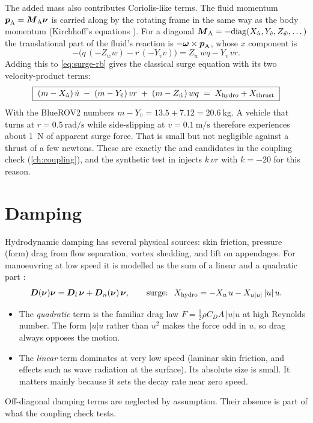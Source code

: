 The added mass also contributes Coriolis-like terms. The fluid momentum
$\boldsymbol{p}_\mathrm{A} = \boldsymbol{M}_\mathrm{A}\boldsymbol{\nu}$ is carried along by the rotating frame
in the same way as the body momentum (Kirchhoff's equations \cite{newman1977}). For a diagonal
$\boldsymbol{M}_\mathrm{A} = -\mathrm{diag}(X_{\dot u}, Y_{\dot v}, Z_{\dot w}, \dots)$ the translational
part of the fluid's reaction is $-\boldsymbol{\omega}\times\boldsymbol{p}_\mathrm{A}$, whose $x$
component is
\begin{equation}
  -\bigl(q\,(-Z_{\dot w}w) - r\,(-Y_{\dot v}v)\bigr) = Z_{\dot w}\,wq - Y_{\dot v}\,vr .
\end{equation}
Adding this to \eqref{eq:surge-rb} gives the classical surge equation with its two
velocity-product terms:
\begin{equation}
  \boxed{\;(m - X_{\dot u})\,\dot u \;-\; (m - Y_{\dot v})\,v r \;+\; (m - Z_{\dot w})\,w q \;=\; X_\mathrm{hydro} + X_\mathrm{thrust}\;}
  \label{eq:surge-full}
\end{equation}
With the BlueROV2 numbers $m - Y_{\dot v} = 13.5 + 7.12 = \qty{20.6}{\kilogram}$. A vehicle
that turns at $r = \qty{0.5}{\radian\per\second}$ while side-slipping at
$v = \qty{0.1}{\meter\per\second}$ therefore experiences about \qty{1}{\newton} of apparent
surge force. That is small but not negligible against a thrust of a few newtons. These are
exactly the  and  candidates in the coupling check (\cref{ch:coupling}),
and the synthetic test in  injects $k\,vr$ with
$k = -20$ for this reason.

\section{Damping}

Hydrodynamic damping has several physical sources: skin friction, pressure (form) drag from
flow separation, vortex shedding, and lift on appendages. For manoeuvring at low speed it is
modelled as the sum of a linear and a quadratic part \cite[sec.~6.4]{fossen2011}:
\begin{equation}
  \boldsymbol{D}(\boldsymbol{\nu})\boldsymbol{\nu} = \boldsymbol{D}_l\,\boldsymbol{\nu} + \boldsymbol{D}_n(\boldsymbol{\nu})\,\boldsymbol{\nu},
  \qquad
  \text{surge: } \; X_\mathrm{hydro} = -X_u\,u - X_{u|u|}\,|u|\,u .
  \label{eq:damping}
\end{equation}
\begin{itemize}
  \item The \emph{quadratic} term is the familiar drag law $F = \tfrac12\rho C_D A\,|u|u$
        at high Reynolds number. The form $|u|u$ rather than $u^2$ makes the force odd in
        $u$, so drag always opposes the motion.
  \item The \emph{linear} term dominates at very low speed (laminar skin friction, and
        effects such as wave radiation at the surface). Its absolute size is small. It
        matters mainly because it sets the decay rate near zero speed.
\end{itemize}
Off-diagonal damping terms are neglected by assumption. Their absence is part of what the
coupling check tests.

